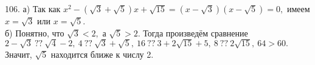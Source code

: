 106. а) Так как $x^2-(\sqrt{3}+\sqrt{5})x+\sqrt{15}=(x-\sqrt{3})(x-\sqrt{5})=0,$ имеем $x=\sqrt{3}$ или $x=\sqrt{5}.$\\
б) Понятно, что $\sqrt{3}<2,$ а $\sqrt{5}>2.$ Тогда произведём сравнение $2-\sqrt{3}\ ??\ \sqrt{4}-2,\ 4\ ??\ \sqrt{3}+\sqrt{5},\ 16\ ??\ 3+2\sqrt{15}+5,\ 8\ ??\ 2\sqrt{15},\ 64>60.$ Значит, $\sqrt{5}$ находится ближе к числу 2.\\
